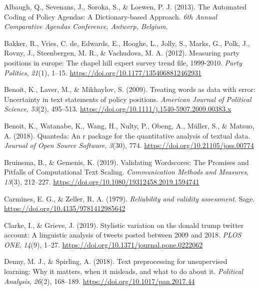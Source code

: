 \documentclass[
]{book}
\newlength{\cslhangindent}
\newenvironment{CSLReferences}[2] %
 {\begin{list}{}{%
  \setlength{\itemindent}{0pt}
  \setlength{\leftmargin}{0pt}
  \setlength{\parsep}{0pt}
  \ifodd #1
   \setlength{\leftmargin}{\cslhangindent}
   \setlength{\itemindent}{-1\cslhangindent}
  \fi
  \setlength{\itemsep}{#2\baselineskip}}}
 {\end{list}}
\begin{document}
\label{refs}
\begin{CSLReferences}{1}{2}
Albaugh, Q., Sevenans, J., Soroka, S., \& Loewen, P. J. (2013). {The Automated Coding of Policy Agendas: A Dictionary-based Approach}. \emph{6th Annual Comparative Agendas Conference, Antwerp, Belgium}.

Bakker, R., Vries, C. de, Edwards, E., Hooghe, L., Jolly, S., Marks, G., Polk, J., Rovny, J., Steenbergen, M. R., \& Vachudova, M. A. (2012). Measuring party positions in europe: The chapel hill expert survey trend file, 1999-2010. \emph{Party Politics}, \emph{21}(1), 1--15. \url{https://doi.org/10.1177/1354068812462931}

Benoit, K., Laver, M., \& Mikhaylov, S. (2009). Treating words as data with error: Uncertainty in text statements of policy positions. \emph{American Journal of Political Science}, \emph{53}(2), 495--513. \url{https://doi.org/10.1111/j.1540-5907.2009.00383.x}

Benoit, K., Watanabe, K., Wang, H., Nulty, P., Obeng, A., Müller, S., \& Matsuo, A. (2018). Quanteda: An r package for the quantitative analysis of textual data. \emph{Journal of Open Source Software}, \emph{3}(30), 774. \url{https://doi.org/10.21105/joss.00774}

Bruinsma, B., \& Gemenis, K. (2019). {Validating Wordscores: The Promises and Pitfalls of Computational Text Scaling}. \emph{Communication Methods and Measures}, \emph{13}(3), 212--227. \url{https://doi.org/10.1080/19312458.2019.1594741}

Carmines, E. G., \& Zeller, R. A. (1979). \emph{Reliability and validity assessment}. Sage. \url{https://doi.org/10.4135/9781412985642}

Clarke, I., \& Grieve, J. (2019). Stylistic variation on the donald trump twitter account: A linguistic analysis of tweets posted between 2009 and 2018. \emph{PLOS ONE}, \emph{14}(9), 1--27. \url{https://doi.org/10.1371/journal.pone.0222062}

Denny, M. J., \& Spirling, A. (2018). Text preprocessing for unsupervised learning: Why it matters, when it misleads, and what to do about it. \emph{Political Analysis}, \emph{26}(2), 168--189. \url{https://doi.org/10.1017/pan.2017.44}


\end{CSLReferences}
\end{document}
